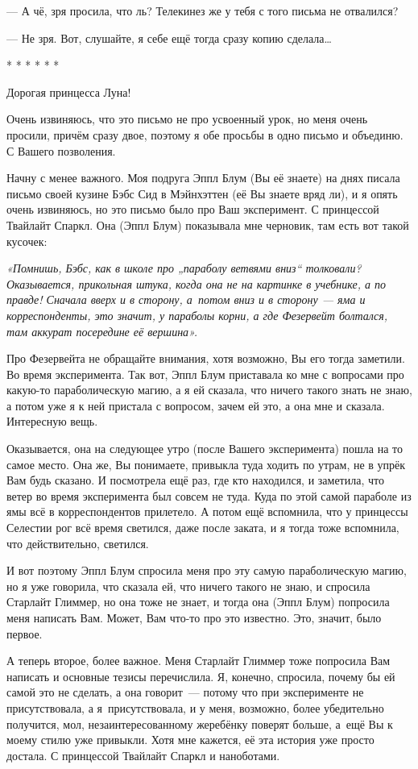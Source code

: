 \documentclass[fontsize=11pt,a5paper,titlepage=firstcover]{scrbook}
\begin{document}
--- А чё, зря просила, что ль? Телекинез же у тебя с того письма не отвалился?

--- Не зря. Вот, слушайте, я себе ещё тогда сразу копию сделала{\ldots}
\begin{center}
	* * * * * *
\end{center}

Дорогая принцесса Луна!

Очень извиняюсь, что это письмо не про усвоенный урок, но меня очень просили, причём сразу двое, поэтому я обе просьбы в одно письмо и объединю. С Вашего позволения.

Начну с менее важного. Моя подруга Эппл Блум (Вы её знаете) на днях писала письмо своей кузине Бэбс Сид в Мэйнхэттен (её Вы знаете вряд ли), и я опять очень извиняюсь, но это письмо было про Ваш эксперимент. С принцессой Твайлайт Спаркл. Она (Эппл Блум) показывала мне черновик, там есть вот такой кусочек:

\emph{«Помнишь, Бэбс, как в школе про „параболу ветвями вниз“ толковали? Оказывается, прикольная штука, когда она не на картинке в учебнике, а по правде! Сначала вверх и в сторону, а~потом вниз и в сторону --- яма и корреспонденты, это значит, у параболы корни, а где Фезервейт болтался, там аккурат посередине её вершина».}

Про Фезервейта не обращайте внимания, хотя возможно, Вы его тогда заметили. Во время эксперимента. Так вот, Эппл Блум приставала ко мне с вопросами про какую-то параболическую магию, а я ей сказала, что ничего такого знать не знаю, а потом уже я к ней пристала с вопросом, зачем ей это, а она мне и сказала. Интересную вещь.

Оказывается, она на следующее утро (после Вашего эксперимента) пошла на то самое место. Она же, Вы понимаете, привыкла туда ходить по утрам, не в упрёк Вам будь сказано. И посмотрела ещё раз, где кто находился, и заметила, что ветер во время эксперимента был совсем не туда. Куда по этой самой параболе из ямы всё в корреспондентов прилетело. А потом ещё вспомнила, что у принцессы Селестии рог всё время светился, даже после заката, и я тогда тоже вспомнила, что действительно, светился.

И вот поэтому Эппл Блум спросила меня про эту самую параболическую магию, но я уже говорила, что сказала ей, что ничего такого не знаю, и спросила Старлайт Глиммер, но она тоже не знает, и тогда она (Эппл Блум) попросила меня написать Вам. Может, Вам что-то про это известно. Это, значит, было первое.

А теперь второе, более важное. Меня Старлайт Глиммер тоже попросила Вам написать и основные тезисы перечислила. Я, конечно, спросила, почему бы ей самой это не сделать, а она говорит~--- потому что при эксперименте не присутствовала, а я~присутствовала, и у меня, возможно, более убедительно получится, мол, незаинтересованному жеребёнку поверят больше, а~ещё Вы к моему стилю уже привыкли. Хотя мне кажется, её эта история уже просто достала. С принцессой Твайлайт Спаркл и наноботами.
\end{document}
